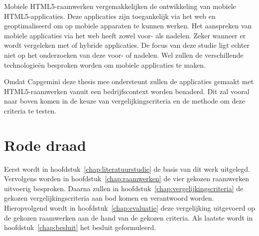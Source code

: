Mobiele HTML5-raamwerken vergemakkelijken de ontwikkeling van mobiele HTML5-applicaties.
Deze applicaties zijn toegankelijk via het web en geoptimaliseerd om op mobiele apparaten te kunnen werken.
Het aanspreken van mobiele applicaties via het web heeft zowel voor- als nadelen.
Zeker wanneer er wordt vergeleken met  of hybride applicaties.
De focus van deze studie ligt echter niet op het onderzoeken van deze voor- of nadelen.
Wel zullen de verschillende technologieën besproken worden om mobiele applicaties te maken.

Omdat Capgemini deze thesis mee ondersteunt zullen de applicaties gemaakt met HTML5-raamwerken vanuit een bedrijfscontext worden benaderd.
Dit zal vooral naar boven komen in de keuze van vergelijkingscriteria en de methode om deze criteria te testen.

\section{Rode draad}
Eerst wordt in hoofdstuk~\ref{chap:literatuurstudie} de basis van dit werk uitgelegd.
Vervolgens worden in hoofdstuk~\ref{chap:raamwerken} de vier gekozen raamwerken uitvoerig besproken.
Daarna zullen in hoofdstuk~\ref{chap:vergelijkingscriteria} de gekozen vergelijkingscriteria aan bod komen en verantwoord worden.
Hieropvolgend wordt in hoofdstuk~\ref{chap:evaluatie} deze vergelijking uitgevoerd op de gekozen raamwerken aan de hand van de gekozen criteria.
Als laatste wordt in hoofdstuk~\ref{chap:besluit} het besluit geformuleerd.

